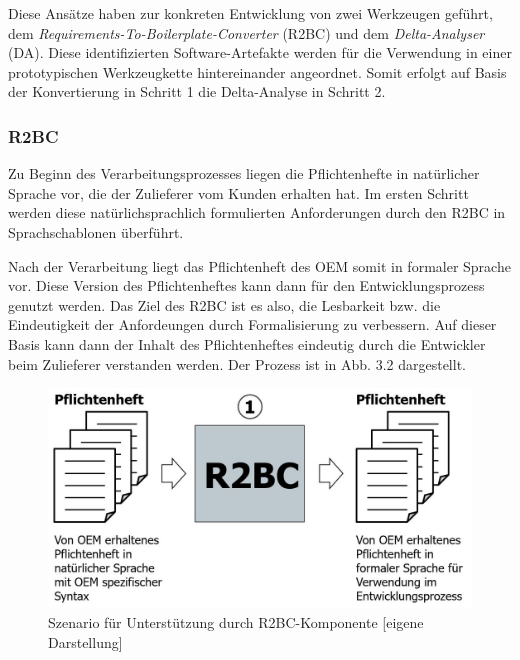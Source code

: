 \documentclass[12pt]{report}
\begin{document}
Diese Ansätze haben zur konkreten Entwicklung von zwei Werkzeugen geführt, dem \textit{Requirements-To-Boilerplate-Converter} (R2BC) und dem \textit{Delta-Analyser} (DA). Diese identifizierten Software-Artefakte werden für die Verwendung in einer prototypischen Werkzeugkette hintereinander angeordnet. Somit erfolgt auf Basis der Konvertierung in Schritt 1 die Delta-Analyse in Schritt 2.

\subsubsection{R2BC}
Zu Beginn des Verarbeitungsprozesses liegen die Pflichtenhefte in natürlicher Sprache vor, die der Zulieferer vom Kunden erhalten hat. Im ersten Schritt werden diese natürlichsprachlich formulierten Anforderungen durch den R2BC in Sprachschablonen überführt. 

Nach der Verarbeitung liegt das Pflichtenheft des OEM somit in formaler Sprache vor. Diese Version des Pflichtenheftes kann dann für den Entwicklungsprozess genutzt werden. Das Ziel des R2BC ist es also, die Lesbarkeit bzw. die Eindeutigkeit der Anfordeungen durch Formalisierung zu verbessern. Auf dieser Basis kann dann der Inhalt des Pflichtenheftes eindeutig durch die Entwickler beim Zulieferer verstanden werden. Der Prozess ist in Abb. 3.2 dargestellt.
\begin{figure}[h!]
\begin{center}
\includegraphics[scale=0.5]{Bilder/Prozess-R2BC.jpg}
\caption{Szenario für Unterstützung durch R2BC-Komponente [eigene Darstellung]}
\end{center}
\end{figure}
\end{document}
